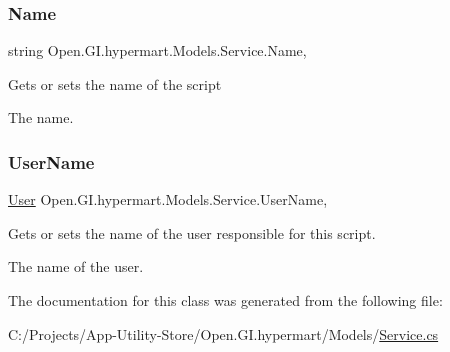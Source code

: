 \subsubsection{\texorpdfstring{Name}{Name}}
{\footnotesize\ttfamily string Open.\+G\+I.\+hypermart.\+Models.\+Service.\+Name\hspace{0.3cm}{\ttfamily [get]}, {\ttfamily [set]}}



Gets or sets the name of the script 

The name. \hypertarget{class_open_1_1_g_i_1_1hypermart_1_1_models_1_1_service_ab0719ac31980c99022040f5887ad332d}{}\label{class_open_1_1_g_i_1_1hypermart_1_1_models_1_1_service_ab0719ac31980c99022040f5887ad332d} 
\subsubsection{\texorpdfstring{User\+Name}{UserName}}
{\footnotesize\ttfamily \hyperlink{class_open_1_1_g_i_1_1hypermart_1_1_models_1_1_user}{User} Open.\+G\+I.\+hypermart.\+Models.\+Service.\+User\+Name\hspace{0.3cm}{\ttfamily [get]}, {\ttfamily [set]}}



Gets or sets the name of the user responsible for this script. 

The name of the user. 

The documentation for this class was generated from the following file\+:\begin{DoxyCompactItemize}
\item 
C\+:/\+Projects/\+App-\/\+Utility-\/\+Store/\+Open.\+G\+I.\+hypermart/\+Models/\hyperlink{_service_8cs}{Service.\+cs}\end{DoxyCompactItemize}

